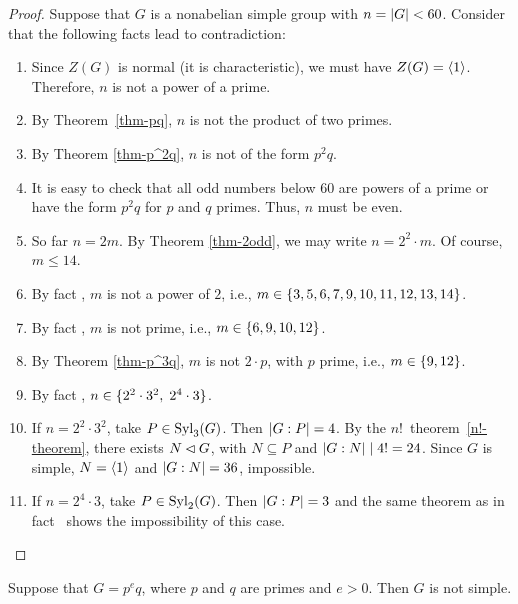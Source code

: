 \begin{proof} Suppose that $G$ is a nonabelian simple group with $n=\left\vert{G}\right\vert<60$. Consider that the following facts lead to contradiction:
\begin{enumerate}[\upshape 1.]
    \item Since $Z(G)$ is normal (it is characteristic), we must have $Z(G)=\langle1\rangle$. Therefore, $n$ is not a power of a prime.
    \item By Theorem~\ref{thm-pq}, $n$ is not the product of two primes.
    \item By Theorem \ref{thm-p^2q}, $n$ is not of the form $p^2q$.
    \item It is easy to check that all odd numbers below $60$ are powers of a prime or have the form $p^2q$ for $p$ and $q$ primes. Thus, $n$ must be even.
    \item So far $n=2m$. By Theorem \ref{thm-2odd}, we may write $n=2^2\cdot m$. Of course, $m\le14$.
    \item By fact {}, $m$ is not a power of $2$, i.e., $m\in\{3, 5, 6, 7, 9, 10, 11, 12, 13, 14\}$.
    \item By fact {}, $m$ is not prime, i.e., $m\in\{6,9,10,12\}$.
    \item By Theorem \ref{thm-p^3q}, $m$ is not $2\cdot p$, with $p$ prime, i.e., $m\in\{9,12\}$.
    \item By fact {}, $n\in\{2^2\cdot 3^2,\;2^4\cdot3\}$.
    \item If $n=2^2\cdot3^2$, take $P\in{\rm Syl}_3(G)$. Then $\left\vert{G:P}\right\vert=4$. By the $n!$~theorem~\ref{n!-theorem}, there exists $N\lhd G$, with $N\subseteq P$ and $\left\vert{G:N}\right\vert\mid4!=24$. Since $G$ is simple, $N=\langle1\rangle$ and $\left\vert{G:N}\right\vert=36$, impossible.
    \item If $n=2^4\cdot3$, take $P\in{\rm Syl}_2(G)$. Then $\left\vert{G:P}\right\vert=3$ and the same theorem as in fact~{} shows the impossibility of this case.
\end{enumerate}
 \end{proof}

\begin{thm}
    Suppose that\/ $G = p^eq$, where $p$ and $q$ are primes and $e>0$. Then $G$ is not simple.
\end{thm}

